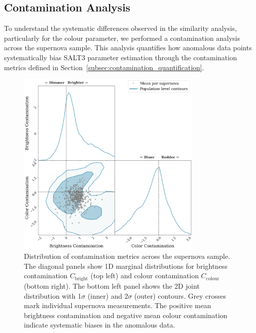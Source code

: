 \subsection{Contamination Analysis}
\label{subsec:contamination_analysis}

To understand the systematic differences observed in the similarity analysis, particularly for the colour parameter, we performed a contamination analysis across the supernova sample. This analysis quantifies how anomalous data points systematically bias SALT3 parameter estimation through the contamination metrics defined in Section~\ref{subsec:contamination_quantification}.

\begin{figure}
\centering
\includegraphics[width=0.8\textwidth]{images/recreated_contamination_plot.png}
\caption{Distribution of contamination metrics across the supernova sample. The diagonal panels show 1D marginal distributions for brightness contamination $C_{\mathrm{bright}}$ (top left) and colour contamination $C_{\mathrm{colour}}$ (bottom right). The bottom left panel shows the 2D joint distribution with 1$\sigma$ (inner) and 2$\sigma$ (outer) contours. Grey crosses mark individual supernova measurements. The positive mean brightness contamination and negative mean colour contamination indicate systematic biases in the anomalous data.}
\label{fig:contamination_triangle}
\end{figure}

